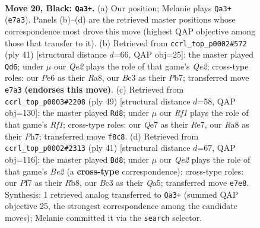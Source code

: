 \documentclass[11pt]{article}
\begin{document}
\clearpage

\begin{figure}[p]\centering
\begin{subfigure}{0.46\textwidth}\centering
\resizebox{\linewidth}{!}{%
\newchessgame
\chessboard[
  setfen={r4rk1/p3qp1p/4p3/pP1pQ1P1/P2P2P1/2b4P/2P5/2K3RR b - - 2 20},
  showmover=false,
  pgfstyle=straightmove, color=movearrow, markmove={e7-a3}
]}
\caption{}
\end{subfigure}\hfill
\begin{subfigure}{0.46\textwidth}\centering
\resizebox{\linewidth}{!}{%
\newchessgame
\chessboard[
  setfen={r4rk1/1p1bqp1p/6p1/3Pp3/1pQ5/6P1/PP3PBP/R2R2K1 b - - 0 21},
  showmover=false,
  pgfstyle=straightmove, color=movearrow, markmove={e7-d6}
]}
\caption{}
\end{subfigure}
\\[4pt]
\begin{subfigure}{0.46\textwidth}\centering
\resizebox{\linewidth}{!}{%
\newchessgame
\chessboard[
  setfen={5rk1/p3rppp/Qp3q2/2P5/3P1p2/5P2/P5PP/R2R2K1 b - - 1 25},
  showmover=false,
  pgfstyle=straightmove, color=movearrow, markmove={f8-d8}
]}
\caption{}
\end{subfigure}\hfill
\begin{subfigure}{0.46\textwidth}\centering
\resizebox{\linewidth}{!}{%
\newchessgame
\chessboard[
  setfen={1r3rk1/4bppp/p2p4/qp1Q2P1/5p1P/P7/1PP5/1K1R1B1R b - - 0 21},
  showmover=false,
  pgfstyle=straightmove, color=movearrow, markmove={e7-d8}
]}
\caption{}
\end{subfigure}
\caption{\textbf{Move 20, Black: \texttt{Qa3+}.} (a) Our position; Melanie plays \texttt{Qa3+} (\texttt{e7a3}). Panels (b)--(d) are the retrieved master positions whose correspondence most drove this move (highest QAP objective among those that transfer to it). (b) Retrieved from \texttt{ccrl\_top\_p0002\#572} (ply 41) [structural distance $d$=66, QAP obj=25]: the master played \texttt{Qd6}; under $\mu$ our \emph{Qe2} plays the role of that game's \emph{Qe2}; cross-type roles: our \emph{P}e6 as their \emph{R}a8, our \emph{B}c3 as their \emph{P}b7; transferred move \texttt{e7a3} \textbf{(endorses this move)}. (c) Retrieved from \texttt{ccrl\_top\_p0003\#2208} (ply 49) [structural distance $d$=58, QAP obj=130]: the master played \texttt{Rd8}; under $\mu$ our \emph{Rf1} plays the role of that game's \emph{Rf1}; cross-type roles: our \emph{Q}e7 as their \emph{R}e7, our \emph{R}a8 as their \emph{P}h7; transferred move \texttt{f8c8}. (d) Retrieved from \texttt{ccrl\_top\_p0002\#2313} (ply 41) [structural distance $d$=67, QAP obj=116]: the master played \texttt{Bd8}; under $\mu$ our \emph{Qe2} plays the role of that game's \emph{Be2} (a \textbf{cross-type} correspondence); cross-type roles: our \emph{P}f7 as their \emph{R}b8, our \emph{B}c3 as their \emph{Q}a5; transferred move \texttt{e7e8}. Synthesis: 1 retrieved analog transferred to \texttt{Qa3+} (summed QAP objective 25, the strongest correspondence among the candidate moves); Melanie committed it via the \texttt{search} selector.}
\label{fig:thought-m39}
\end{figure}
\end{document}

